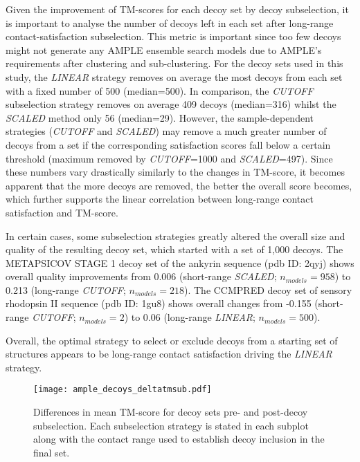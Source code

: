 Given the improvement of TM-scores for each decoy set by decoy subselection, it is important to analyse the number of decoys left in each set after long-range contact-satisfaction subselection. This metric is important since too few decoys might not generate any AMPLE ensemble search models due to AMPLE's requirements after clustering and sub-clustering. For the decoy sets used in this study, the \textit{LINEAR} strategy removes on average the most decoys from each set with a fixed number of 500 (median=500). In comparison, the \textit{CUTOFF} subselection strategy removes on average 409 decoys (median=316) whilst the \textit{SCALED} method only 56 (median=29). However, the sample-dependent strategies (\textit{CUTOFF} and \textit{SCALED}) may remove a much greater number of decoys from a set if the corresponding satisfaction scores fall below a certain threshold (maximum removed by \textit{CUTOFF}=1000 and \textit{SCALED}=497). Since these numbers vary drastically similarly to the changes in TM-score, it becomes apparent that the more decoys are removed, the better the overall score becomes, which further supports the linear correlation between long-range contact satisfaction and TM-score.

In certain cases, some subselection strategies greatly altered the overall size and quality of the resulting decoy set, which started with a set of 1,000 decoys. The METAPSICOV STAGE 1 decoy set of the ankyrin sequence (\gls{pdb} ID: 2qyj) shows overall quality improvements from 0.006 (short-range \textit{SCALED}; $n_{models}=958$) to 0.213 (long-range \textit{CUTOFF}; $n_{models}=218$). The CCMPRED decoy set of sensory rhodopsin II sequence (\gls{pdb} ID: 1gu8) shows overall changes from -0.155 (short-range \textit{CUTOFF}; $n_{models}=2$) to 0.06 (long-range \textit{LINEAR}; $n_{models}=500$).

Overall, the optimal strategy to select or exclude decoys from a starting set of structures appears to be long-range contact satisfaction driving the \textit{LINEAR} strategy.

\begin{figure}[H]
	\centering
	\texttt{[image: ample\_decoys\_deltatmsub.pdf]}
        \caption[TM-score comparison pre- and post-decoy subselection]{Differences in mean TM-score  for decoy sets pre- and post-decoy subselection. Each subselection strategy is stated in each subplot along with the contact range used to establish decoy inclusion in the final set.}
	\label{fig:ample_decoys_deltatmsub}
\end{figure}

